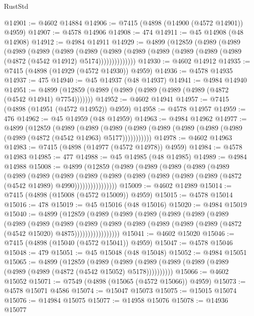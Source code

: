 \begin{lexlean}{RustStd}
\begin{coremodule}
@14901 := @4602 @14884
@14906 := @7415 (@4898 (@14900 (@4572 @14901)) @4959)
@14907 := @4578 @14906
@14908 := 474
@14911 := @45 @14908 (@48 @14908)
@14912 := @4984 @14911
@14929 := @4899
    (@12859
      (@4989
        (@4989
          (@4989
            (@4989
              (@4989
                (@4989
                  (@4989
                    (@4989 (@4989 (@4989 (@4989 (@4989 (@4872 (@4542 @14912) @5174))))))))))))))
@14930 := @4602 @14912
@14935 := @7415 (@4898 (@14929 (@4572 @14930)) @4959)
@14936 := @4578 @14935
@14937 := 475
@14940 := @45 @14937 (@48 @14937)
@14941 := @4984 @14940
@14951 := @4899 (@12859 (@4989 (@4989 (@4989 (@4989 (@4989 (@4872 (@4542 @14941) @7754)))))))
@14952 := @4602 @14941
@14957 := @7415 (@4898 (@14951 (@4572 @14952)) @4959)
@14958 := @4578 @14957
@14959 := 476
@14962 := @45 @14959 (@48 @14959)
@14963 := @4984 @14962
@14977 := @4899
    (@12859
      (@4989
        (@4989
          (@4989 (@4989 (@4989 (@4989 (@4989 (@4989 (@4989 (@4872 (@4542 @14963) @5177)))))))))))
@14978 := @4602 @14963
@14983 := @7415 (@4898 (@14977 (@4572 @14978)) @4959)
@14984 := @4578 @14983
@14985 := 477
@14988 := @45 @14985 (@48 @14985)
@14989 := @4984 @14988
@15008 := @4899
    (@12859
      (@4989
        (@4989
          (@4989
            (@4989
              (@4989
                (@4989
                  (@4989
                    (@4989
                      (@4989
                        (@4989
                          (@4989 (@4989 (@4989 (@4989 (@4872 (@4542 @14989) @4990))))))))))))))))
@15009 := @4602 @14989
@15014 := @7415 (@4898 (@15008 (@4572 @15009)) @4959)
@15015 := @4578 @15014
@15016 := 478
@15019 := @45 @15016 (@48 @15016)
@15020 := @4984 @15019
@15040 := @4899
    (@12859
      (@4989
        (@4989
          (@4989
            (@4989
              (@4989
                (@4989
                  (@4989
                    (@4989
                      (@4989
                        (@4989
                          (@4989
                            (@4989 (@4989 (@4989 (@4989 (@4872 (@4542 @15020) @4875)))))))))))))))))
@15041 := @4602 @15020
@15046 := @7415 (@4898 (@15040 (@4572 @15041)) @4959)
@15047 := @4578 @15046
@15048 := 479
@15051 := @45 @15048 (@48 @15048)
@15052 := @4984 @15051
@15065 := @4899
    (@12859
      (@4989 (@4989 (@4989 (@4989 (@4989 (@4989 (@4989 (@4989 (@4872 (@4542 @15052) @5178))))))))))
@15066 := @4602 @15052
@15071 := @7549 (@4898 (@15065 (@4572 @15066)) @4959)
@15073 := @4578 @15071 @4586
@15074 := @15047 @15073
@15075 := @15015 @15074
@15076 := @14984 @15075
@15077 := @14958 @15076
@15078 := @14936 @15077

\end{coremodule}
\end{lexlean}

